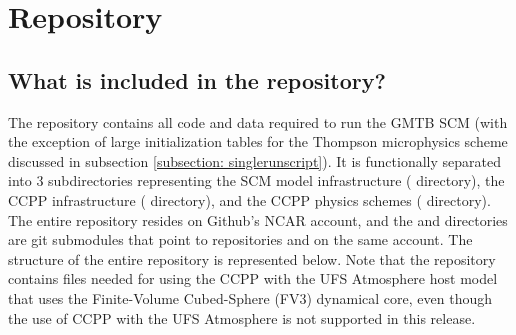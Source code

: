 \chapter{Repository}
\label{chapter: repository}

\section{What is included in the repository?}
The repository contains all code and data required to run the GMTB SCM (with the exception of large initialization tables for the Thompson microphysics scheme discussed in subsection \ref{subsection: singlerunscript}). It is functionally separated into 3 subdirectories representing the SCM model infrastructure ( directory), the CCPP infrastructure ( directory), and the CCPP physics schemes ( directory). The entire  repository resides on Github's NCAR account, and the  and  directories are git submodules that point to repositories  and  on the same account. The structure of the entire repository is represented below. Note that the  repository contains files needed for using the CCPP with the UFS Atmosphere host model that uses the Finite-Volume Cubed-Sphere (FV3) dynamical core, even though the use of CCPP with the UFS Atmosphere is not supported in this release.

